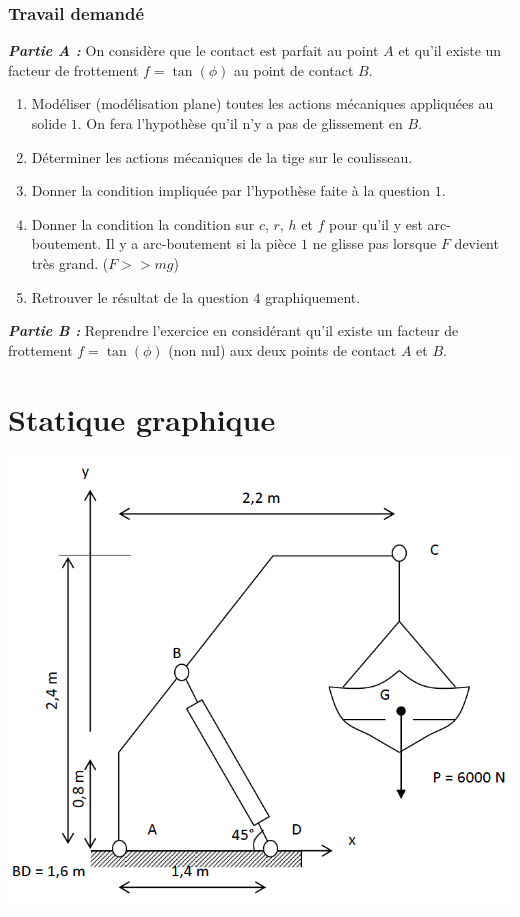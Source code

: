 \subsubsection{Travail demandé}
\textbf{\textit{Partie A :}} On considère que le contact est parfait au point $A$ et qu'il existe un facteur de frottement $f=\tan(\phi)$ au point de contact $B$.
\begin{enumerate}
\item Modéliser (modélisation plane) toutes les actions mécaniques appliquées au solide $1$. On fera l'hypothèse qu'il n'y a pas de glissement en $B$.
\item Déterminer les actions mécaniques de la tige sur le coulisseau.
\item Donner la condition impliquée par l'hypothèse faite à la question $1$.
\item Donner la condition la condition sur $c$, $r$, $h$ et $f$ pour qu'il y est arc-boutement. Il y a arc-boutement si la pièce $1$ ne glisse pas lorsque $F$ devient très grand. ($F>>mg$)
\item Retrouver le résultat de la question $4$ graphiquement.
\end{enumerate}
\textbf{\textit{Partie B :}} Reprendre l'exercice en considérant qu'il existe un facteur de frottement $f=\tan(\phi)$ (non nul) aux deux points de contact $A$ et $B$.

\newpage


\section{Statique graphique}


\begin{center}
\includegraphics[scale=0.5]{png/grue.png}
\end{center}


